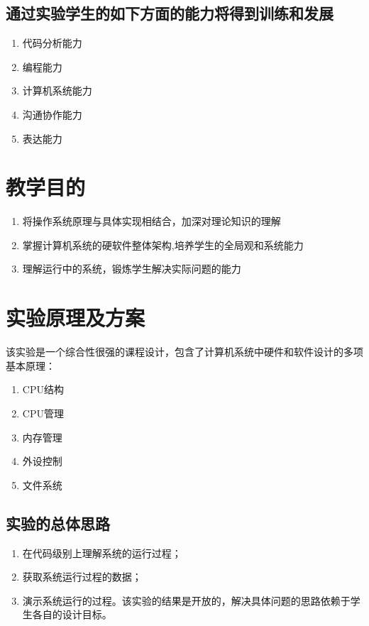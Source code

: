 \documentclass[]{report}
\begin{document}
\section{通过实验学生的如下方面的能力将得到训练和发展}
\begin{enumerate}[（1）]
    \item 代码分析能力
    \item 编程能力
    \item 计算机系统能力
    \item 沟通协作能力
    \item 表达能力
\end{enumerate}

\chapter{教学目的}
\begin{enumerate}[（1）]
    \item 将操作系统原理与具体实现相结合，加深对理论知识的理解
    \item 掌握计算机系统的硬软件整体架构,培养学生的全局观和系统能力
    \item 理解运行中的系统，锻炼学生解决实际问题的能力
\end{enumerate}

\chapter{实验原理及方案}

该实验是一个综合性很强的课程设计，包含了计算机系统中硬件和软件设计的多项基本原理：
\begin{enumerate}[-]
    \item CPU结构
    \item CPU管理
    \item 内存管理
    \item 外设控制
    \item 文件系统
\end{enumerate}

\section{实验的总体思路}
\begin{enumerate}[（1）]
    \item 在代码级别上理解系统的运行过程；
    \item 获取系统运行过程的数据；
    \item 演示系统运行的过程。该实验的结果是开放的，解决具体问题的思路依赖于学生各自的设计目标。
\end{enumerate}
\end{document}
